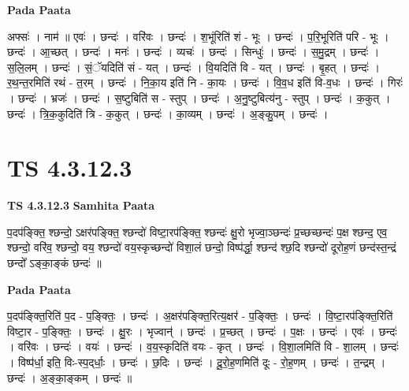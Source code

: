 \documentclass[17pt]{extarticle}
\begin{document}
\textbf{Pada Paata} \newline

अफ्सः॑ । नाम॑ ॥ एवः॑ । छन्दः॑ । वरि॑वः । छन्दः॑ । श॒भूंरिति॑ शं - भूः । छन्दः॑ । प॒रि॒भूरिति॑ परि - भूः । छन्दः॑ । आ॒च्छत् । छन्दः॑ । मनः॑ । छन्दः॑ । व्यचः॑ । छन्दः॑ । सिन्धुः॑ । छन्दः॑ । स॒मु॒द्रम् । छन्दः॑ । स॒लि॒लम् । छन्दः॑ । सं॒ॅयदिति॑ सं - यत् । छन्दः॑ । वि॒यदिति॑ वि - यत् । छन्दः॑ । बृ॒हत् । छन्दः॑ । र॒थ॒न्त॒रमिति॑ रथं - त॒रम् । छन्दः॑ । नि॒का॒य इति॑ नि - का॒यः । छन्दः॑ । वि॒व॒ध इति॑ वि-व॒धः । छन्दः॑ । गिरः॑ । छन्दः॑ । भ्रजः॑ । छन्दः॑ । स॒ष्टुबिति॑ स - स्तुप् । छन्दः॑ । अ॒नु॒ष्टुबित्य॑नु - स्तुप् । छन्दः॑ । क॒कुत् । छन्दः॑ । त्रि॒क॒कुदिति॑ त्रि - क॒कुत् । छन्दः॑ । का॒व्यम् । छन्दः॑ । अ॒ङ्कु॒पम् । छन्दः॑ ।  \newline





\section{ TS 4.3.12.3 }

\textbf{TS 4.3.12.3 } \newline
\textbf{Samhita Paata} \newline

प॒दप॑ङ्क्ति॒ श्छन्दो॒ ऽक्षर॑पङ्क्ति॒ श्छन्दो॑ विष्टा॒रप॑ङ्क्ति॒ श्छन्दः॑ क्षु॒रो भृज्वा॒ञ्छन्दः॑ प्र॒च्छच्छन्दः॑ प॒क्ष श्छन्द॒ एव॒ श्छन्दो॒ वरि॑व॒ श्छन्दो॒ वय॒ श्छन्दो॑ वय॒स्कृच्छन्दो॑ विशा॒लं छन्दो॒ विष्प॑र्द्धा॒ श्छन्द॑ श्छ॒दि श्छन्दो॑ दूरोह॒णं छन्द॑स्त॒न्द्रं छन्दो᳚ ऽङ्का॒ङ्कं छन्दः॑ ॥ \newline

\textbf{Pada Paata} \newline

प॒दप॑ङ्क्ति॒रिति॑ प॒द - प॒ङ्क्तिः॒ । छन्दः॑ । अ॒क्षर॑पङ्क्ति॒रित्य॒क्षर॑ - प॒ङ्क्तिः॒ । छन्दः॑ । वि॒ष्टा॒रप॑ङ्क्ति॒रिति॑ विष्टा॒र - प॒ङ्क्तिः॒ । छन्दः॑ । क्षु॒रः । भृज्वान्॑ । छन्दः॑ । प्र॒च्छत् । छन्दः॑ । प॒क्षः । छन्दः॑ । एवः॑ । छन्दः॑ । वरि॑वः । छन्दः॑ । वयः॑ । छन्दः॑ । व॒य॒स्कृदिति॑ वयः - कृत् । छन्दः॑ । वि॒शा॒लमिति॑ वि - शा॒लम् । छन्दः॑ । विष्प॑र्धा॒ इति॒ विः-स्प॒द्‌र्धाः॒ । छन्दः॑ । छ॒दिः । छन्दः॑ । दू॒रो॒ह॒णमिति॑ दूः - रो॒ह॒णम् । छन्दः॑ । त॒न्द्रम् । छन्दः॑ । अ॒ङ्का॒ङ्कम् । छन्दः॑ ॥  \newline




\end{document}
